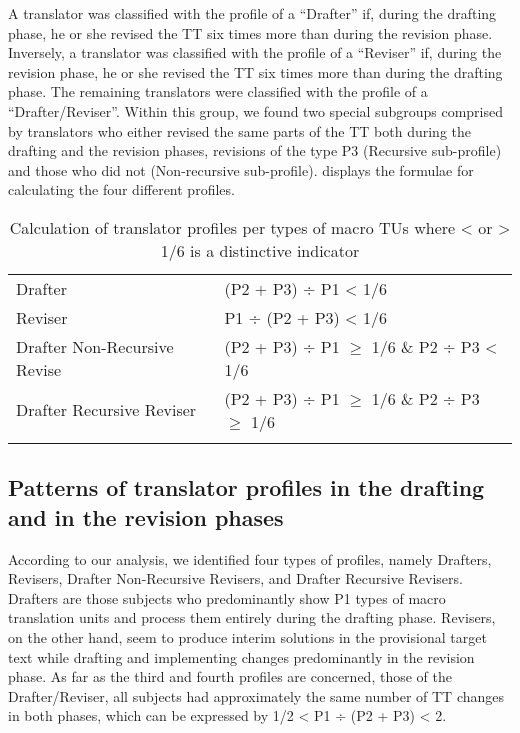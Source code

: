 \documentclass[output=paper]{LSP/langsci}
\begin{document}
A translator was classified with the profile of a ``Drafter'' if, during the drafting phase, he or she revised the TT six times more than during the revision phase. Inversely, a translator was classified with the profile of a ``Reviser'' if, during the revision phase, he or she revised the TT six times more than during the drafting phase. The remaining translators were classified with the profile of a ``Drafter/Reviser''. Within this group, we found two special subgroups comprised by translators who either revised the same parts of the TT both during the drafting and the revision phases, revisions of the type P3 (Recursive sub-profile) and those who did not (Non-recursive sub-profile).  displays the formulae for calculating the four different profiles.

\begin{table}
\begin{tabular}{ l l }
\lsptoprule
  Drafter &  (P2 + P3) ÷ P1 {\textless} 1/6 \\
  Reviser & P1 ÷ (P2 + P3) {\textless} 1/6  \\
  Drafter Non-Recursive Revise &  (P2 + P3) ÷ P1 ${\geq}$ 1/6 \& P2 ÷ P3 {\textless} 1/6  \\
  Drafter Recursive Reviser & (P2 + P3) ÷ P1 ${\geq}$ 1/6 \& P2 ÷ P3 ${\geq}$ 1/6  \\
  \lspbottomrule
\end{tabular}
\caption{Calculation of translator profiles per types of macro TUs where {\textless} or {\textgreater} 1/6 is a distinctive indicator}
\label{tab:alves:3}
\end{table}

\subsection{Patterns of translator profiles in the drafting and in the revision phases}\label{sec:alves:4.2}

According to our analysis, we identified four types of profiles, namely Drafters, Revisers, Drafter Non-Recursive Revisers, and Drafter Recursive Revisers. Drafters are those subjects who predominantly show P1 types of macro translation units and process them entirely during the drafting phase. Revisers, on the other hand, seem to produce interim solutions in the provisional target text while drafting and implementing changes predominantly in the revision phase. As far as the third and fourth profiles are concerned, those of the Drafter/Reviser, all subjects had approximately the same number of TT changes in both phases, which can be expressed by 1/2 {\textless} P1 ÷ (P2 + P3) {\textless} 2.
\end{document}
